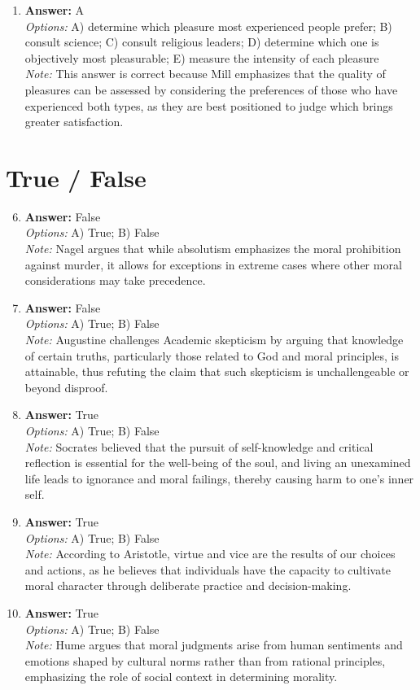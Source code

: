 \documentclass[12pt]{article}
\begin{document}
\begin{enumerate}[label=\arabic*.]
\item \textbf{Answer:} A
\\ \textit{Options:} A) determine which pleasure most experienced people prefer; B) consult science; C) consult religious leaders; D) determine which one is objectively most pleasurable; E) measure the intensity of each pleasure
\\ \textit{Note:} This answer is correct because Mill emphasizes that the quality of pleasures can be assessed by considering the preferences of those who have experienced both types, as they are best positioned to judge which brings greater satisfaction.
\end{enumerate}

\section*{True / False}
\begin{enumerate}[label=\arabic*.]
\setcounter{enumi}{5}
\item \textbf{Answer:} False
\\ \textit{Options:} A) True; B) False
\\ \textit{Note:} Nagel argues that while absolutism emphasizes the moral prohibition against murder, it allows for exceptions in extreme cases where other moral considerations may take precedence.
\item \textbf{Answer:} False
\\ \textit{Options:} A) True; B) False
\\ \textit{Note:} Augustine challenges Academic skepticism by arguing that knowledge of certain truths, particularly those related to God and moral principles, is attainable, thus refuting the claim that such skepticism is unchallengeable or beyond disproof.
\item \textbf{Answer:} True
\\ \textit{Options:} A) True; B) False
\\ \textit{Note:} Socrates believed that the pursuit of self-knowledge and critical reflection is essential for the well-being of the soul, and living an unexamined life leads to ignorance and moral failings, thereby causing harm to one's inner self.
\item \textbf{Answer:} True
\\ \textit{Options:} A) True; B) False
\\ \textit{Note:} According to Aristotle, virtue and vice are the results of our choices and actions, as he believes that individuals have the capacity to cultivate moral character through deliberate practice and decision-making.
\item \textbf{Answer:} True
\\ \textit{Options:} A) True; B) False
\\ \textit{Note:} Hume argues that moral judgments arise from human sentiments and emotions shaped by cultural norms rather than from rational principles, emphasizing the role of social context in determining morality.
\end{enumerate}
\end{document}
